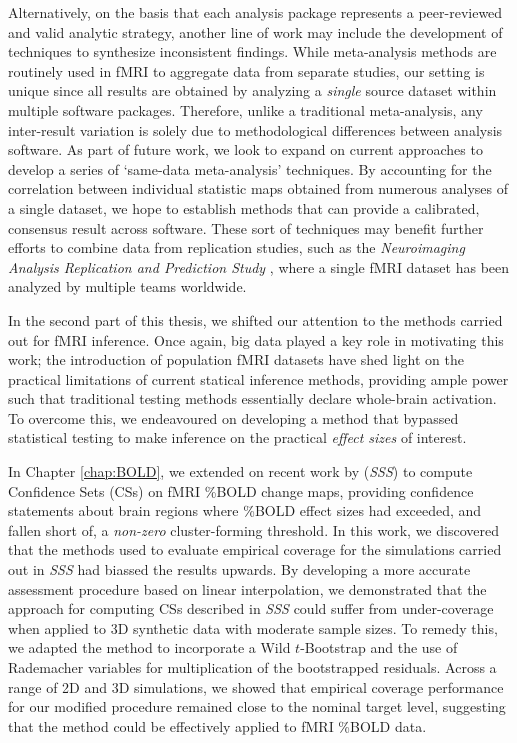 Alternatively, on the basis that each analysis package represents a peer-reviewed and valid analytic strategy, another line of work may include the development of techniques to synthesize inconsistent findings. While meta-analysis methods are routinely used in fMRI to aggregate data from separate studies, our setting is unique since all results are obtained by analyzing a \textit{single} source dataset within multiple software packages. Therefore, unlike a traditional meta-analysis, any inter-result variation is solely due to methodological differences between analysis software. As part of future work, we look to expand on current approaches to develop a series of `same-data meta-analysis' techniques. By accounting for the correlation between individual statistic maps obtained from numerous analyses of a single dataset, we hope to establish methods that can provide a calibrated, consensus result across software. These sort of techniques may benefit further efforts to combine data from replication studies, such as the \textit{Neuroimaging Analysis Replication and Prediction Study} \citep{Botvinik-Nezer2019-qu}, where a single fMRI dataset has been analyzed by multiple teams worldwide. 

In the second part of this thesis, we shifted our attention to the methods carried out for fMRI inference. Once again, big data played a key role in motivating this work; the introduction of population fMRI datasets have shed light on the practical limitations of current statical inference methods, providing ample power such that traditional testing methods essentially declare whole-brain activation. To overcome this, we endeavoured on developing a method that bypassed statistical testing to make inference on the practical \textit{effect sizes} of interest.

In Chapter \ref{chap:BOLD}, we extended on recent work by \citet*{Sommerfeld2018-zl} (\textit{SSS}) to compute Confidence Sets (CSs) on fMRI \%BOLD change maps, providing confidence statements about brain regions where \%BOLD effect sizes had exceeded, and fallen short of, a \textit{non-zero} cluster-forming threshold. In this work, we discovered that the methods used to evaluate empirical coverage for the simulations carried out in \textit{SSS} had biassed the results upwards. By developing a more accurate assessment procedure based on linear interpolation, we demonstrated that the approach for computing CSs described in \textit{SSS} could suffer from under-coverage when applied to 3D synthetic data with moderate sample sizes. To remedy this, we adapted the method to incorporate a Wild $t$-Bootstrap and the use of Rademacher variables for multiplication of the bootstrapped residuals. Across a range of 2D and 3D simulations, we showed that empirical coverage performance for our modified procedure remained close to the nominal target level, suggesting that the method could be effectively applied to fMRI \%BOLD data.

